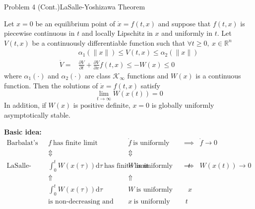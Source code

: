 \documentclass[8pt]{beamer}
\begin{document}
\begin{frame}[t]{Problem 4 (Cont.)}{LaSalle-Yoshizawa Theorem}
\begin{theorem}
  \small Let $x=0$ be an equilibrium point of $\dot x =f(t,x)$ and suppose that $f(t,x)$ is
  piecewise continuous in $t$ and locally Lipschitz in $x$ and uniformly in $t$. Let $V(t,x)$ be a continuously differentiable function such that $\forall t \ge 0, \ x \in \mathbb{R}^n$
  \begin{align*}
      &\alpha_1(\|x\|) \le V(t,x) \le \alpha_2(\|x\|) \\
      \dot{V} = &\frac{\partial V}{\partial t} + \frac{\partial V}{\partial x} f(t,x) \le -W(x) \le 0
  \end{align*}
  where $\alpha_1(\cdot)$ and $\alpha_2(\cdot)$ are class $\mathcal{K}_{\infty}$ functions and $W(x)$ is a continuous function. Then the solutions of $\dot{x}=f(t,x)$ satisfy
  \begin{equation*}
      \lim\limits_{t\to{\infty}}W(x(t))=0
  \end{equation*}
  In addition, if $W(x)$ is positive definite, $x=0$ is globally uniformly asymptotically stable.
\end{theorem}

{\bf Basic idea:}
  {\footnotesize\[\begin{matrix}
    \text{Barbalat's lemma}&f\ \text{has finite limit} & \dot{f}\ \text{is uniformly continuous} & \implies & \dot{f}\to 0\\
    &\Updownarrow & \Updownarrow & &\\
    \text{LaSalle-Yoshizawa Theorem}&\int^t_0  W (x (\tau)) \mathrm{d} \tau\ \text{has finite limit} & W\ \text{is uniformly continuous w.r.t.}\ t & \implies & W(x(t))\to 0\\
    &\Uparrow &\Uparrow && \\
    & \int^t_0  W (x (\tau)) \mathrm{d} \tau\ & W\ \text{is uniformly continuous w.r.t.}\ x&&\\
    &\text{is non-decreasing and upper bounded}&x\ \text{is uniformly continuous w.r.t.}\ t &&
  \end{matrix}\]}
\end{frame}
\end{document}
